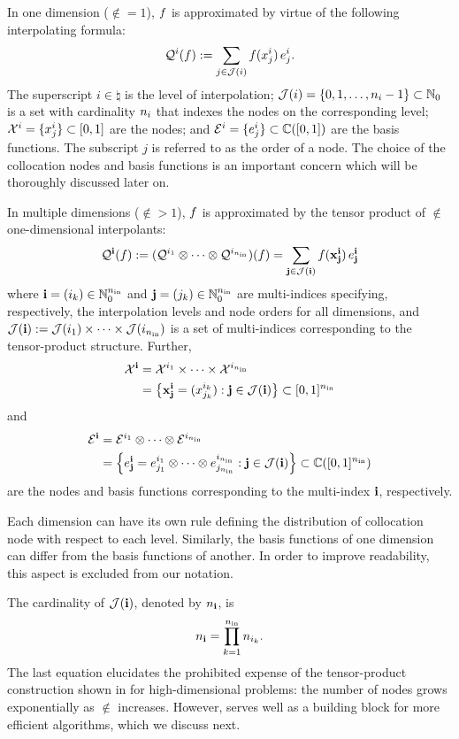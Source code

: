 In one dimension ($\nin = 1$), $f$ is approximated by virtue of the following
interpolating formula:
\begin{equation} \elab{tensor-1d}
  \tensor{i}(\f) := \sum_{j \in \index(i)} \f(\x^i_j) \, \e^i_j.
\end{equation}
The superscript $i \in \natural$ is the level of interpolation; $\mathcal{J}(i) = \{
0, 1, \dots, n_i - 1 \} \subset \mathbb{N}_0$ is a set with cardinality $n_i$ that
indexes the nodes on the corresponding level; $\mathcal{X}^i = \{ x^i_j \} \subset [0,
1]$ are the nodes; and $\mathcal{E}^i = \{ e^i_j \} \subset \mathbb{C}([0, 1])$ are the
basis functions. The subscript $j$ is referred to as the order of a node. The
choice of the collocation nodes and basis functions is an important concern
which will be thoroughly discussed later on.

In multiple dimensions ($\nin > 1$), $f$ is approximated by the tensor product
of $\nin$ one-dimensional interpolants:
\begin{equation} \elab{tensor}
  \tensor{\vi}(\f) := (\tensor{i_1} \otimes \cdots \otimes \tensor{i_\nin})(\f) = \sum_{\vj \in \index(\vi)} \f(\vx^\vi_\vj) \, \e^\vi_\vj
\end{equation}
where $\mathbf{i} = (i_k) \in \mathbb{N}_0^{n_\text{in}}$ and $\mathbf{j} = (j_k) \in \mathbb{N}_0^{n_\text{in}}$ are
multi-indices specifying, respectively, the interpolation levels and node orders
for all dimensions, and $\mathcal{J}(\mathbf{i}) := \mathcal{J}(i_1) \times \cdots \times
\mathcal{J}(i_{n_\text{in}})$ is a set of multi-indices corresponding to the tensor-product
structure. Further,
\begin{align*}
  \mathcal{X}^{\mathbf{i}} &= \mathcal{X}^{i_1} \times \cdots \times \mathcal{X}^{i_{n_\text{in}}} \\
         &= \left\{ \mathbf{x}^{\mathbf{i}}_{\mathbf{j}} = (x^{i_k}_{j_k}): \mathbf{j} \in \mathcal{J}(\mathbf{i}) \right\} \subset [0, 1]^{n_\text{in}}
\end{align*}
and
\begin{align*}
  \mathcal{E}^{\mathbf{i}} &= \mathcal{E}^{i_1} \otimes \cdots \otimes \mathcal{E}^{i_{n_\text{in}}} \\
         &= \left\{ e^{\mathbf{i}}_{\mathbf{j}} = e^{i_1}_{j_1} \otimes \cdots \otimes e^{i_{n_\text{in}}}_{j_{n_\text{in}}}: \mathbf{j} \in \mathcal{J}(\mathbf{i}) \right\} \subset \mathbb{C}([0, 1]^{n_\text{in}})
\end{align*}
are the nodes and basis functions corresponding to the multi-index $\mathbf{i}$,
respectively.
\begin{remark}
Each dimension can have its own rule defining the distribution of collocation
node with respect to each level. Similarly, the basis functions of one dimension
can differ from the basis functions of another. In order to improve readability,
this aspect is excluded from our notation.
\end{remark}
The cardinality of $\mathcal{J}(\mathbf{i})$, denoted by $n_{\mathbf{i}}$, is
\begin{equation} \elab{tensor-cardinality}
  \n_\vi = \prod_{k = 1}^\nin \n_{i_k}.
\end{equation}
The last equation elucidates the prohibited expense of the tensor-product
construction shown in  for high-dimensional problems: the number of
nodes grows exponentially as $\nin$ increases. However,  serves
well as a building block for more efficient algorithms, which we discuss next.
